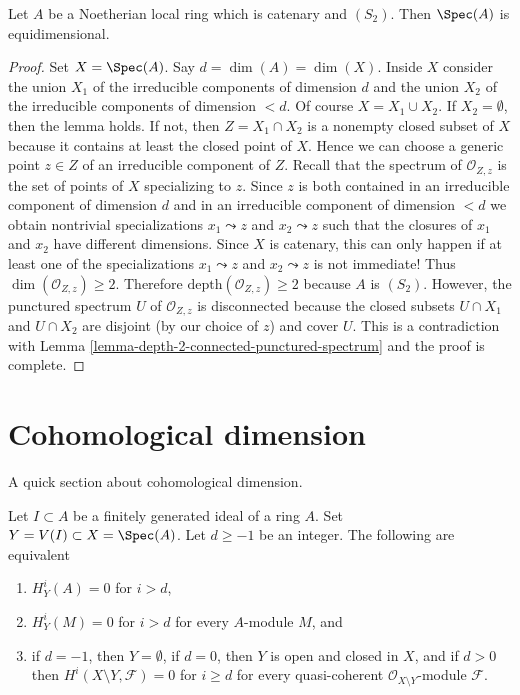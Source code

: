 \begin{lemma}
\label{lemma-catenary-S2-equidimensional}
\begin{reference}
\cite[IV Corollary 5.10.9]{EGA}
\end{reference}
Let $A$ be a Noetherian local ring which is catenary and $(S_2)$.
Then $\Spec(A)$ is equidimensional.
\end{lemma}

\begin{proof}
Set $X = \Spec(A)$. Say $d = \dim(A) = \dim(X)$. Inside $X$ consider the
union $X_1$ of the irreducible components of dimension $d$ and the union
$X_2$ of the irreducible components of dimension $< d$. Of course
$X = X_1 \cup X_2$. If $X_2 = \emptyset$,
then the lemma holds. If not, then $Z = X_1 \cap X_2$ is a nonempty closed
subset of $X$ because it contains at least the closed point of $X$.
Hence we can choose a generic point $z \in Z$ of an irreducible component
of $Z$. Recall that the spectrum of $\mathcal{O}_{Z, z}$ is the set of points
of $X$ specializing to $z$. Since $z$ is both contained in an
irreducible component of dimension $d$ and in an irreducible component
of dimension $< d$ we obtain nontrivial specializations $x_1 \leadsto z$ and
$x_2 \leadsto z$ such that the closures of $x_1$ and $x_2$ have different
dimensions. Since $X$ is catenary, this can only happen if at least
one of the specializations $x_1 \leadsto z$ and $x_2 \leadsto z$ is not
immediate! Thus $\dim(\mathcal{O}_{Z, z}) \geq 2$. Therefore
$\text{depth}(\mathcal{O}_{Z, z}) \geq 2$ because $A$ is $(S_2)$.
However, the punctured spectrum $U$ of $\mathcal{O}_{Z, z}$ is disconnected
because the closed subsets $U \cap X_1$ and $U \cap X_2$ are disjoint
(by our choice of $z$) and cover $U$. This is a contradiction with
Lemma \ref{lemma-depth-2-connected-punctured-spectrum}
and the proof is complete.
\end{proof}



\section{Cohomological dimension}
\label{section-cd}

\noindent
A quick section about cohomological dimension.

\begin{lemma}
\label{lemma-cd}
Let $I \subset A$ be a finitely generated ideal of a ring $A$.
Set $Y = V(I) \subset X = \Spec(A)$. Let $d \geq -1$ be an integer.
The following are equivalent
\begin{enumerate}
\item $H^i_Y(A) = 0$ for $i > d$,
\item $H^i_Y(M) = 0$ for $i > d$ for every $A$-module $M$, and
\item if $d = -1$, then $Y = \emptyset$, if $d = 0$, then
$Y$ is open and closed in $X$, and if $d > 0$ then
$H^i(X \setminus Y, \mathcal{F}) = 0$ for $i \geq d$
for every quasi-coherent $\mathcal{O}_{X \setminus Y}$-module $\mathcal{F}$.
\end{enumerate}
\end{lemma}

